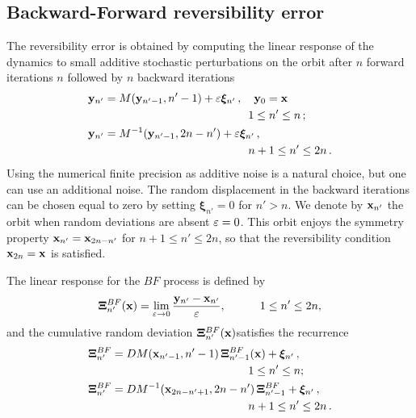 \subsection{Backward-Forward reversibility error\label{subsection:bf}}
%
The reversibility error is obtained by computing the linear response of the dynamics to small additive stochastic perturbations on the orbit after $n$ forward iterations $n$ followed by $n$ backward iterations 
%
\begin{equation}
 \begin{split}
   &\vb{y}_{n'}  = M(\vb{y}_{n'-1},n'-1) +\eps\boldsymbol{\xi}_{n'} \, ,  \quad \vb{y}_0=\vb{x} \\
   & \hskip 5 truecm 1\le n'\le n \, ; \\ 
   &\vb{y}_{n'} = M^{-1}(\vb{y}_{ n'-1}, 2n-n')+\eps   \boldsymbol{\xi}_{n' } \, , \\
   &   \hskip 5 truecm n+1\le n'\le 2n \, .
  \end{split}
\label{eq2-8}
\end{equation}
%
Using the numerical finite precision as additive noise is a natural choice, but one can use an additional noise. The random displacement in the backward iterations can be chosen equal to zero by setting
$\boldsymbol{\xi}_{n'}=0$ for $n'>n$. We denote by $\vb{x}_{n'}$ the orbit when random deviations are absent $\varepsilon=0$. This orbit
enjoys the symmetry property $\vb{x}_{n'}= \vb{x}_{2n-n'}$ for $n+1\le n'\le 2n$, so that the reversibility condition $\vb{x}_{2n}=\vb{x}$ is satisfied.

The linear response for the $BF$ process is defined by 
%
\begin{equation}
   \boldsymbol{\Xi}^{BF}_{n'}(\vb{x})  = \lim_{\eps\to 0}\frac{\vb{y}_{n'}-\vb{x}_{n'}}{ \eps},  \quad \qquad  1\le n'\le 2n,  %
\label{eq2-9}
\end{equation}  
%
and the cumulative random deviation $\boldsymbol{\Xi}^{BF}_{n'}(\vb{x})$satisfies the recurrence 
%
\begin{equation}
  \begin{split}
  & \boldsymbol{\Xi}_{n'}^{BF} = DM(\vb{x}_{n'-1},n'-1)\,\boldsymbol{\Xi}_{n'-1}^{BF}(\vb{x})+ \boldsymbol{\xi}_{n'} \, , \\ 
  & \hskip 5 truecm 1\le n'\le n;\\ 
    & \boldsymbol{\Xi}_{n'}^{BF} = DM^{-1}(\vb{x}_{2n-n' +1},2n-n')\, \boldsymbol{\Xi}_{n'-1}^{BF}    + \boldsymbol{\xi}_{n'} \, , \\
    & \hskip 5 truecm n+1 \le n'\le 2n \, .
  \end{split}
\label{eq2-10}
\end{equation}
%

